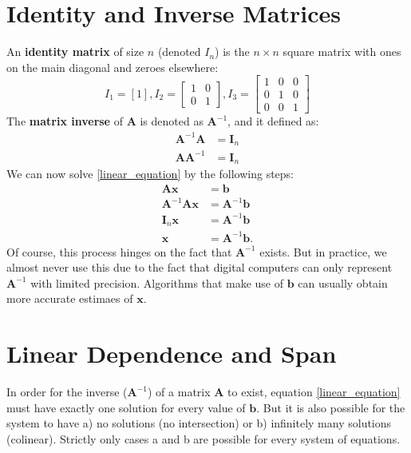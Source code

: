 \documentclass[11pt,twocolumn]{report}
\begin{document}
\section{Identity and Inverse Matrices}
An \textbf{identity matrix} of size $n$ (denoted $I_n$)
is the $n \times n$ square matrix with ones on the main diagonal and
zeroes elsewhere:
\begin{equation*}
  I_1 = [1],
  I_2 = \begin{bmatrix}
    1 & 0\\
    0 & 1
  \end{bmatrix},
  I_3 = \begin{bmatrix}
    1 & 0 & 0\\
    0 & 1 & 0\\
    0 & 0 & 1
  \end{bmatrix}
\end{equation*}
The \textbf{matrix inverse} of $\bm{A}$ is denoted as $\bm{A}^{-1}$, and it defined as:
\begin{align}
  \bm{A}^{-1}\bm{A} & = \bm{I}_n\\
  \bm{A}\bm{A}^{-1} & = \bm{I}_n
\end{align}
We can now solve \ref{linear_equation} by the following steps:
\begin{align}
  \bm{Ax} & = \bm{b}\\
  \bm{A}^{-1}\bm{Ax} & = \bm{A}^{-1}\bm{b}\\
  \bm{I}_n\bm{x} & = \bm{A}^{-1}\bm{b}\\
  \bm{x} & = \bm{A}^{-1}\bm{b}.
\end{align}
Of course, this process hinges on the fact that $\bm{A}^{-1}$ exists.
But in practice, we almost never use this due to the fact that digital
computers can only represent $\bm{A}^{-1}$ with limited precision. Algorithms
that make use of $\bm{b}$ can usually obtain more accurate estimaes of
$\bm{x}$.

\section{Linear Dependence and Span}

In order for the inverse ($\bm{A}^{-1}$) of a matrix $\bm{A}$ to exist, equation
\ref{linear_equation} must have exactly one solution for every value of
$\bm{b}$. But it is also possible for the system to have a) no solutions (no
intersection) or b) infinitely many solutions (colinear). Strictly only cases a
and b are possible for every system of equations.
\end{document}
